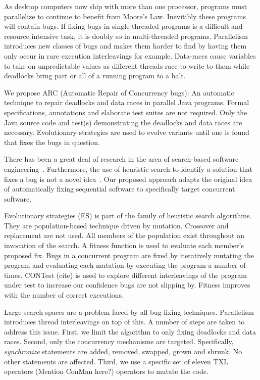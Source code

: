 \documentclass[10pt, conference, compsocconf]{IEEEtran}
\begin{document}
As desktop computers now ship with more than one processor, programs must
parallelize to continue to benefit from Moore's Law. Inevitibly these programs
will contain bugs. If fixing bugs in single-threaded programs is a difficult
and resource intensive task,  it is doubly so in multi-threaded programs.
Parallelism introduces new classes of bugs and makes them harder to find by
having them only occur in rare execution interleavings for example. Data-races
cause variables to take on unpredictable values as different threads race to
write to them while deadlocks bring part or all of a running program to a halt.

We propose ARC (Automatic Repair of Concurrency bugs): An automatic technique
to repair deadlocks and data races in parallel Java programs. Formal
specifications, annotations and elaborate test suites are not required. Only
the Java source code and test(s) demonstrating the deadlocks and data races are
necessary. Evolutionary strategies are used to evolve variants until one is
found that fixes the bugs in question.

There has been a great deal of research in the area of search-based software
engineering~\cite{Har+10}. Furthermore, the use of heuristic search to identify
a solution that fixes a bug is not a novel idea~\cite{FNWG09, AY08, Arc08,
WT10, WNLF09, WFGN10}. Our proposed approach adapts the original idea of
automatically fixing sequential software to specifically target concurrent
software.

Evolutionary strategies (ES) is part of the family of heuristic search
algorithms. They are population-based technique driven by mutation. Crossover
and replacement are not used.  All members of the population exist throughout
an invocation of the search. A fitness function is used to evaluate each
member's proposed fix. Bugs in a concurrent program are fixed by iteratively
mutating the program and evaluating each mutation by executing the program a
number of times. CONTest (cite) is used to explore different interleavings of
the program under test to increase our confidence bugs are not slipping by.
Fitness improves with the number of correct executions.

Large search spaces are a problem faced by all bug fixing techniques.
Parallelism introduces thread interleavings on top of this. A number of steps
are taken to address this issue.  First, we limit the algorithm to only fixing
deadlocks and data races. Second, only the concurrency mechanisms are targeted.
Specifically, \textit{synchronize} statements are added, removed, swapped,
grown and shrunk. No other statements are affected. Third, we use a specific
set of eleven TXL operators (Mention ConMan here?) operators to mutate the
code.
\end{document}
